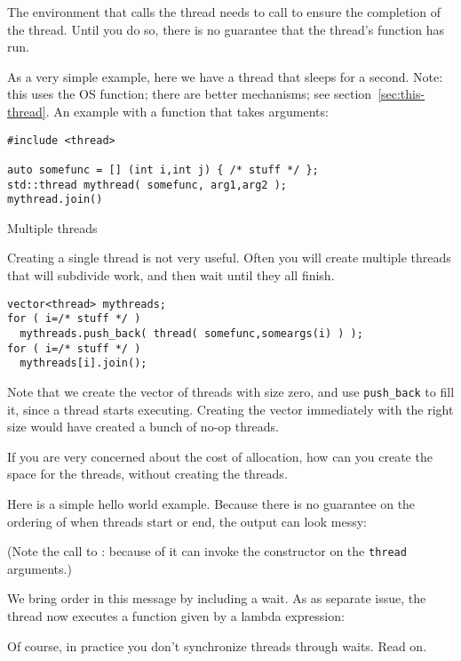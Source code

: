 The environment that calls the thread needs to call 
to ensure the completion of the thread.
Until you do so, there is no guarantee that the thread's
function has run.

As a very simple example, here we have a thread that sleeps for a second.
Note: this uses the \ac{OS}  function;
there are better mechanisms; see section~\ref{sec:this-thread}.
%
%
An example with a function that takes arguments:

\begin{lstlisting}
#include <thread>
  
auto somefunc = [] (int i,int j) { /* stuff */ };
std::thread mythread( somefunc, arg1,arg2 );
mythread.join()
\end{lstlisting}

 {Multiple threads}

Creating a single thread is not very useful.
Often you will create multiple threads
that will subdivide work,
and then wait until they all finish.
\begin{lstlisting}
vector<thread> mythreads;
for ( i=/* stuff */ )
  mythreads.push_back( thread( somefunc,someargs(i) ) );
for ( i=/* stuff */ )
  mythreads[i].join();
\end{lstlisting}
Note that we create the vector of threads with size zero,
and use \lstinline{push_back} to fill it,
since a thread starts executing.
Creating the vector immediately with the right size
would have created a bunch of no-op threads.

\begin{exercise}
  If you are very concerned about the cost of allocation,
  how can you create the space for the threads, without
  creating the threads.
\end{exercise}

Here is a simple hello world example.
Because there is no guarantee on the ordering of when threads
start or end, the output can look messy:
%

(Note the call to :
because of 
it can invoke the constructor on the \lstinline{thread} arguments.)

We bring order in this message by including a wait.
As as separate issue, the thread now executes a function
given by a lambda expression:
%

Of course, in practice you don't synchronize threads through waits.
Read on.

